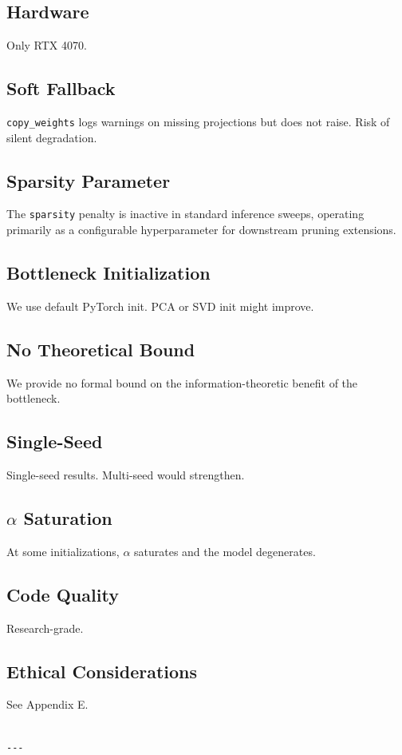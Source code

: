 \subsection{Hardware}

Only RTX 4070.

\subsection{Soft Fallback}

\texttt{copy\_weights} logs warnings on missing projections but does not raise. 
Risk of silent degradation.

\subsection{Sparsity Parameter}

The \texttt{sparsity} penalty is inactive in standard inference sweeps, operating primarily as a configurable hyperparameter for downstream pruning extensions.

\subsection{Bottleneck Initialization}

We use default PyTorch init. PCA or SVD init might improve.

\subsection{No Theoretical Bound}

We provide no formal bound on the information-theoretic benefit of the 
bottleneck.

\subsection{Single-Seed}

Single-seed results. Multi-seed would strengthen.

\subsection{$\alpha$ Saturation}

At some initializations, $\alpha$ saturates and the model degenerates.

\subsection{Code Quality}

Research-grade.

\subsection{Ethical Considerations}

See Appendix E.
\begin{lstlisting}

---
\end{lstlisting}